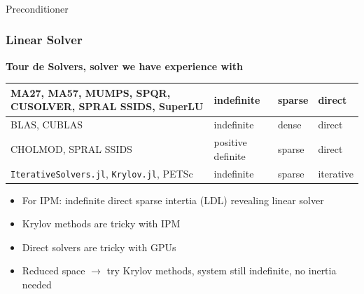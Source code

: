 
\begin{frame}
  \frametitle{}
  \centering
  {\Huge Preconditioner}
\end{frame}

\begin{frame}
  \frametitle{Linear Solver}
  {\bf Tour de Solvers, solver we have experience with}
  \begin{table}
  \begin{tabular}{p{5cm}|lll}
    MA27, MA57, MUMPS, SPQR, CUSOLVER, SPRAL SSIDS, SuperLU & indefinite & sparse & direct \\
    \hline
    BLAS, CUBLAS & indefinite & dense  & direct \\
    \hline
    CHOLMOD, SPRAL SSIDS& positive definite & sparse & direct \\
    \hline
    \lstinline{IterativeSolvers.jl}, \lstinline{Krylov.jl}, PETSc & indefinite & sparse & iterative \\ 
  \end{tabular}
\end{table}
  \begin{itemize}
    \item For IPM: indefinite direct sparse intertia (LDL) revealing linear solver
    \item Krylov methods are tricky with IPM 
    \item Direct solvers are tricky with GPUs
    \item Reduced space $\rightarrow$ try Krylov methods, system still indefinite, no inertia needed
  \end{itemize}
\end{frame}

